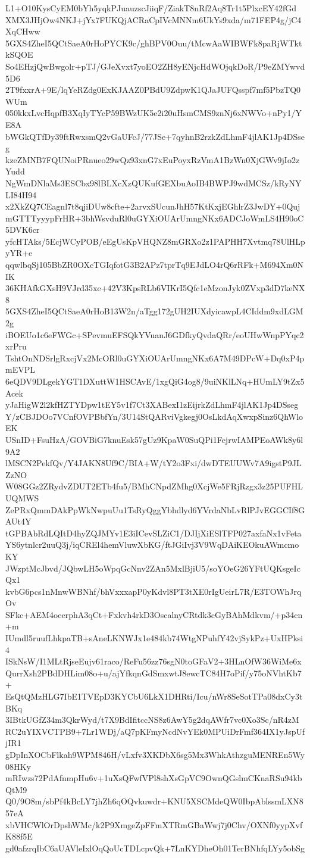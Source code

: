 L1+O10KysCyEM0bYh5yqkPJuauzscJiiqF/ZiakT8nRf2Aq8Tr1t5PlxcEY42fGd
XMX3JHjOw4NKJ+jYx7FUKQjACRaCpIVcMNNm6UkYs9xda/m71FEP4g/jC4XqCHww
5GXS4ZheI5QCtSaeA0rHoPYCK9c/ghBPV0Ouu/tMcwAaWIBWFk8paRjWTktkSQOE
So4EHzjQwBwgolr+pTJ/GJeXvxt7yoEO2ZH8yENjcHdWOjqkDoR/P9eZMYwvd5D6
2T9fxxrA+9E/lqYeRZdg0ExKJAAZ0PBdU9ZdpwK1QJaJUFQsspf7mf5PbzTQ0WUm
050kkxLvcHqpfB3XqIyTYcP59BWzUK5e2i20uHsmCMS9znNj6xNWVo+nPy1/YE8A
bWGkQTfDy39ftRwxsmQ2vGaUFcJ/77JSe+7qyhnB2rzkZdLhmF4jlAK1Jp4DSseg
kzeZMNB7FQUNoiPRnueo29wQz93xnG7xEuPoyxRzVmA1BzWn0XjGWv9jIo2zYudd
NgWmDNlaMs3ESCbx98lBLXcXzQUKufGEXbuAoIB4BWPJ9wdMCSz/kRyNYLI84H94
x2XkZQ7CEagnl7t8qjiDUw8cfte+2arvxSUcunJhH57KtKxjEGhlrZ3JwDY+0Quj
mGTTTyyypFrHR+3bhWsvduRl0uGYXiOUArUmngNKx6ADCJoWmLS4H90oC5DVK6cr
yfcHTAks/5EcjWCyPOB/eEgUsKpVHQNZ8mGRXo2z1PAPHH7Xvtmq78UlHLpyYR+e
qqwlbqSj105BbZR0OXcTGIqfotG3B2APz7tprTq9EJdLO4rQ6rRFk+M694Xm0NIK
36KHAfkGXsH9VJrd35xe+42V3KpsRLb6VIKrI5Qfc1eMzonJyk0ZVxp3dD7keNX8
5GXS4ZheI5QCtSaeA0rHoB13W2n/aTgg172gUH2IUXdyicawpL4CIddm9xdLGM2g
iBOEUo1c6eFWGc+SPevmuEFSQkYVuanJ6GDfkyQvdaQRr/eoUHwWnpPYqc2xrPru
TshtOnNDSrlgRxcjVx2McORl0uGYXiOUArUmngNKx6A7M49DPcW+Dq0xP4pmEVPL
6eQDV9DLgekYGT1DXuttW1HSCAvE/1xgQiG4og8/9uiNKlLNq+HUmLY9tZx5Acek
yJaHigW2l2kfHZTYDpw1tEY5v1f7Ct3XABexI1zEijrkZdLhmF4jlAK1Jp4DSseg
Y/zCBJDOo7VCnfOVPBbfYn/3U14StQARviVgkegj0OsLkdAqXwxpSinz6QhWloEK
USnID+FsuHzA/GOVBiG7knuEsk57gUz9KpaW0SuQPi1FejrwIAMPEoAWk8y6l9A2
lMSCN2PekfQv/Y4JAKN8Uf9C/BIA+W/tY2o3Fxi/dwDTEUUWv7A9igstP9JLZzNO
W08GGz2ZRydvZDUT2ETb4fu5/BMhCNpdZMhg0XcjWe5FRjRzgx3z25PUFHLUQMWS
ZePRxQmmDAkPpWkNwpuUu1TsRyQggYbhdlyd6YVrdaNbLvRlPJvEGGCIf8GAUt4Y
tGPBAbRdLQItD4hyZQJMYv1E3iICevSLZiC1/DJIjXiESlTFP027axfaNx1vFeta
YS6ytnlcr2uuQ3j/iqCREl4hemVluwXbKG/ftJGiIvj3V9WqDAiKEOkuAWmcmoKY
JWzptMcJbvd/JQbwLH5oWpqGcNnv2ZAn5MxlBjiU5/soYOeG26YFtUQKsgeIcQx1
kvbG6pcs1nMnwWBNhf/bhVxxxapP0yKdvl8PT3tXE0rIgUeirL7R/E3TOWhJrqOv
SFkc+AEM4oeerphA3qCt+Fxkvh4rkD3OscalnyCRtdk3cGyBAhMdkvm/+p34cn+m
IUmdl5ruufLhkpaTB+sAneLKNWJx1e484kb74WtgNPuhfY42vjSykPz+UxHPksi4
ISkNsW/I1MLtRjseEujv61raco/ReFu56zz76sgN0toGFaV2+3HLnOfW36WiMe6x
QurrXsh2PBdDHLim08o+u/ajYfkqnGdSmxwtJ8ewcTC84H7oPif/y75oNVhtKb7+
EsQtQMzHLG7IbE1TVEpD3KYCbU6LkX1DHRti/Icu/nWr8SeSotTPa08dxCy3tBKq
3IBtkUGfZ34m3QkrWyd/t7X9BdIfitccNS8z6AwY5g2dqAWfr7vc0Xo3Sc/nR4zM
RC2uYIXVCTPB9+7Lr1WDj/aQ7pKFmyNcdNvYEk0MPUiDrFmf364IX1yJspUfjIR1
gDpInXOCbFlkah9WPM846H/vLxfv3XKDbX6sg5Mx3WhkAthzguMENREn5Wy08HKy
mRIwzs72PdAfnmpHu6v+1uXsQFwfVPl8shXsGpVC9OwnQGslmCKnaRSu94kbQtM9
Q0/9O8m/sbPf4kBcLY7jhZh6qOQvkuwdr+KNU5XSCMdeQW0IbpAblssmLXN857eA
xbVHCWlOrDpshWMc/k2P9XmgeZpFFmXTRmGBaWwj7j0Chv/OXNf0yypXvfK88f5E
gd0afzrqIbC6aUAVleIxlOqQoUcTDLcpvQk+7LnKYDheOh01TerBNhfqLYy5obSg
